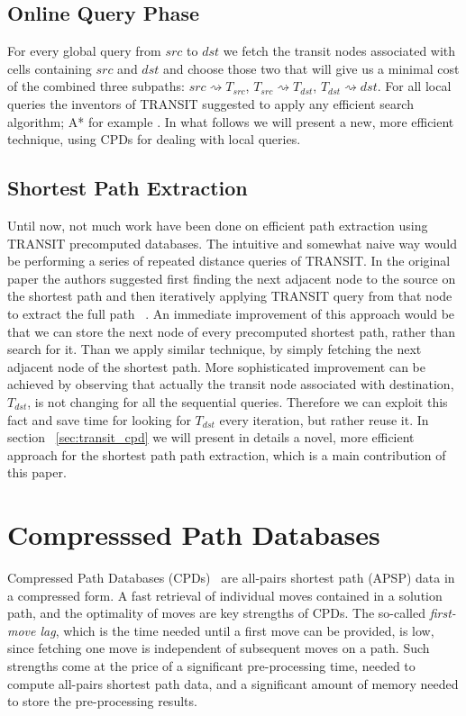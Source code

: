 \documentclass[runningheads,a4paper]{llncs}
\begin{document}
\subsection{Online Query Phase}\label{sub:query}
For every global query from $src$ to $dst$ we fetch the transit nodes associated with cells containing
$src$ and $dst$ and choose those two that will give us a minimal cost of the combined three subpaths:
$src \rightsquigarrow T_{src}$, $T_{src} \rightsquigarrow T_{dst}$, $T_{dst} \rightsquigarrow dst$.
For all local queries the inventors of TRANSIT suggested to apply any efficient search algorithm; A* for example \cite{bast06}.
In what follows we will present a new, more efficient technique, using CPDs for dealing with local queries.

\subsection{Shortest Path Extraction}\label{sub:path_extraction}
Until now, not much work have been done on efficient path extraction using TRANSIT precomputed databases.
The intuitive and somewhat naive way would be performing a series of repeated distance queries of TRANSIT.
In the original paper the authors suggested first finding the next adjacent node to the source on the shortest path
and then iteratively applying TRANSIT query from that node to extract the full path ~\cite{bast06}.
An immediate improvement of this approach would be that we can store the next node of every precomputed
shortest path, rather than search for it.  Than we apply similar technique, by simply fetching the next adjacent node of the shortest path.
More sophisticated improvement can be achieved by observing that actually the transit node associated with destination, $T_{dst}$,
is not changing for all the sequential queries. Therefore we can exploit this fact and save time for looking for $T_{dst}$ every iteration, but 
rather reuse it.
In section ~\ref{sec:transit_cpd} we will present in details a novel, more efficient approach for the shortest path path extraction,
which is a main contribution of this paper.

\section{Compresssed Path Databases}

Compressed Path Databases (CPDs)~\cite{botea11,DBLP:conf/socs/Botea12} are
all-pairs shortest path (APSP) data in a compressed form.
A fast retrieval of individual moves contained in a solution path, and the
optimality of moves are key strengths of CPDs. The so-called \emph{first-move
lag}, which is the time needed until a first move can be provided, is low,
since fetching one move is independent of subsequent moves on a path. 
Such strengths come at the price of a
significant pre-processing time, needed to compute all-pairs shortest path data,
and a significant amount of memory needed to store the pre-processing results.
\end{document}
